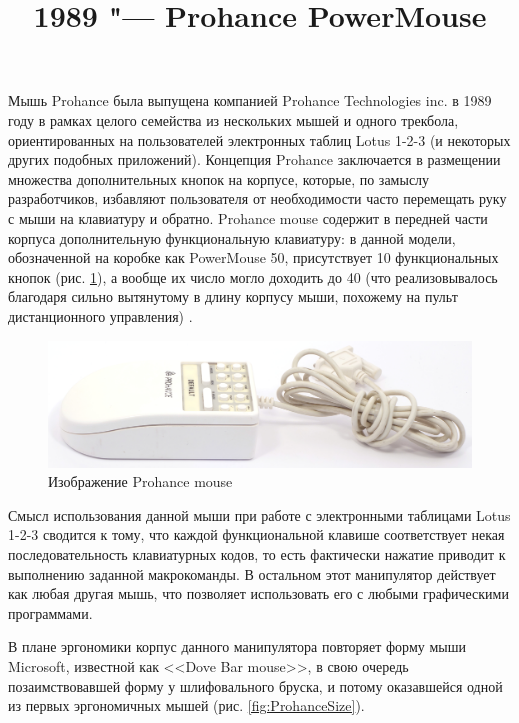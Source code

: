 \documentclass[11pt, a4paper]{article}
\begin{document}
\title{1989 "--- Prohance PowerMouse}
\date{}
\maketitle
{}
Мышь Prohance была выпущена компанией Prohance Technologies inc. в 1989 году в рамках целого семейства из нескольких мышей и одного трекбола, ориентированных на пользователей электронных таблиц Lotus 1-2-3 (и некоторых других подобных приложений). Концепция Prohance заключается в размещении множества дополнительных кнопок на корпусе, которые, по замыслу разработчиков, избавляют пользователя от необходимости часто перемещать руку с мыши на клавиатуру и обратно. Prohance mouse содержит в передней части корпуса дополнительную функциональную клавиатуру: в данной модели, обозначенной на коробке как PowerMouse 50, присутствует 10 функциональных кнопок (рис. \ref{fig:ProhancePhoto}), а вообще их число могло доходить до 40 (что реализовывалось благодаря сильно вытянутому в длину корпусу мыши, похожему на пульт дистанционного управления) \cite{livingston}.

\begin{figure}[h]
    \centering
    \includegraphics[scale=0.55]{1989_prohance_powermouse/pic_30.jpg}
    \caption{Изображение Prohance mouse}
    \label{fig:ProhancePhoto}
\end{figure}

Смысл использования данной мыши при работе с электронными таблицами Lotus 1-2-3 сводится к тому, что каждой функциональной клавише соответствует некая последовательность клавиатурных кодов, то есть фактически нажатие приводит к выполнению заданной макрокоманды. В остальном этот манипулятор действует как любая другая мышь, что позволяет использовать его с любыми графическими программами.

В плане эргономики корпус данного манипулятора повторяет форму мыши Microsoft, известной как <<Dove Bar mouse>>, в свою очередь позаимствовавшей форму у шлифовального бруска, и потому оказавшейся одной из первых эргономичных мышей (рис. \ref{fig:ProhanceSize}).
\end{document}
